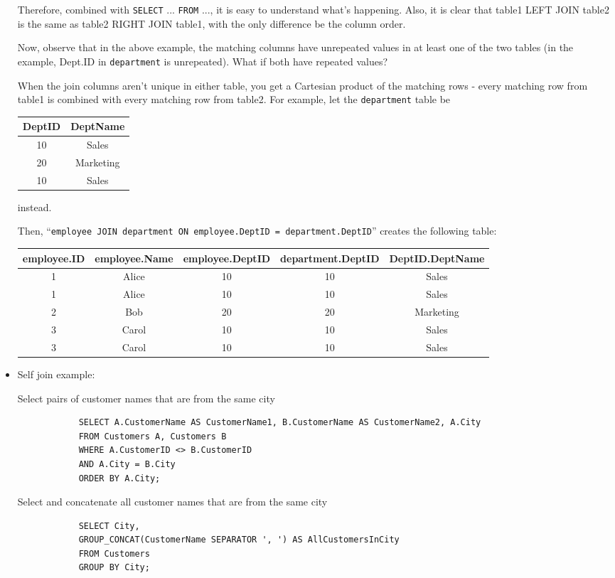 \documentclass{article}
\begin{document}
\begin{itemize}
		Therefore, combined with \texttt{SELECT} ... \texttt{FROM} ..., it is easy to understand what's happening. Also, it is clear that table1 LEFT JOIN table2 is the same as table2 RIGHT JOIN table1, with the only difference be the column order.
		
		Now, observe that in the above example, the matching columns have unrepeated values in at least one of the two tables (in the example, Dept.ID in \texttt{department} is unrepeated). What if both have repeated values?
		
		When the join columns aren't unique in either table, you get a Cartesian product of the matching rows - every matching row from table1 is combined with every matching row from table2. For example, let the \texttt{department} table be
		\begin{tabular}{|c|c|}
			DeptID & DeptName\\
			\hline
			10 & Sales\\
			20 & Marketing\\
			10 & Sales
		\end{tabular} instead.
		
		Then, ``\texttt{employee JOIN department ON employee.DeptID = department.DeptID}'' creates the following table:
		\begin{center}
			\begin{tabular}{|c|c|c|c|c|}
				employee.ID & employee.Name  & employee.DeptID & department.DeptID & DeptID.DeptName \\
				\hline
				1  & Alice & 10 & 10 & Sales\\
				1  & Alice & 10 & 10 & Sales\\
				2  & Bob   & 20 & 20 & Marketing\\
				3  & Carol & 10 & 10 & Sales\\
				3  & Carol & 10 & 10 & Sales
			\end{tabular}
		\end{center}
		
		\item Self join example:
		
		Select pairs of customer names that are from the same city
		\begin{lstlisting}
			SELECT A.CustomerName AS CustomerName1, B.CustomerName AS CustomerName2, A.City
			FROM Customers A, Customers B
			WHERE A.CustomerID <> B.CustomerID
			AND A.City = B.City
			ORDER BY A.City;
		\end{lstlisting}
		
		Select and concatenate all customer names that are from the same city
		\begin{lstlisting}
			SELECT City, 
			GROUP_CONCAT(CustomerName SEPARATOR ', ') AS AllCustomersInCity
			FROM Customers
			GROUP BY City;
			

\end{lstlisting}
\end{itemize}
\end{document}

